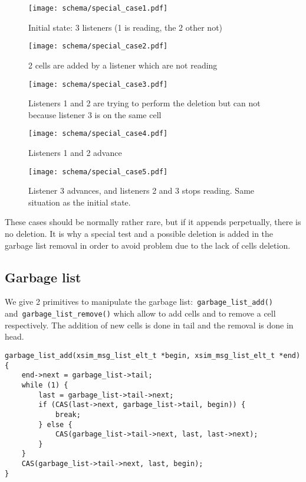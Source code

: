 \begin{figure}[h]
\begin{center}
    \texttt{[image: schema/special\_case1.pdf]}
	\caption{Initial state: 3 listeners (1 is reading, the 2 other not)}
    \label{sp1}

    \texttt{[image: schema/special\_case2.pdf]}
	\caption{2 cells are added by a listener which are not reading}
    \label{sp2}

    \texttt{[image: schema/special\_case3.pdf]}
	\caption{Listeners 1 and 2 are trying to perform the deletion but can not because listener 3 is on the same cell}
    \label{sp3}

    \texttt{[image: schema/special\_case4.pdf]}
	\caption{Listeners 1 and 2 advance}
    \label{sp4}

    \texttt{[image: schema/special\_case5.pdf]}
	\caption{Listener 3 advances, and listeners 2 and 3 stops reading. Same situation as the initial state.}
    \label{sp5}

\end{center}
\end{figure}

These cases should be normally rather rare,
but if it appends perpetually, there is no deletion.
It is why a special test and a possible deletion is added in the garbage list removal in order to
avoid problem due to the lack of cells deletion.


\subsection{Garbage list}
\label{garbage list}

We give 2 primitives to manipulate the garbage list:~\verb|garbage_list_add()|
and~\verb|garbage_list_remove()| which allow to add cells and to remove a cell
respectively. The addition of new cells is done in tail and the removal is done
in head.

\begin{verbatim}
garbage_list_add(xsim_msg_list_elt_t *begin, xsim_msg_list_elt_t *end)
{
    end->next = garbage_list->tail;
    while (1) {
        last = garbage_list->tail->next;
        if (CAS(last->next, garbage_list->tail, begin)) {
            break;
        } else {
            CAS(garbage_list->tail->next, last, last->next);
        }
    }
    CAS(garbage_list->tail->next, last, begin);
}
\end{verbatim}

